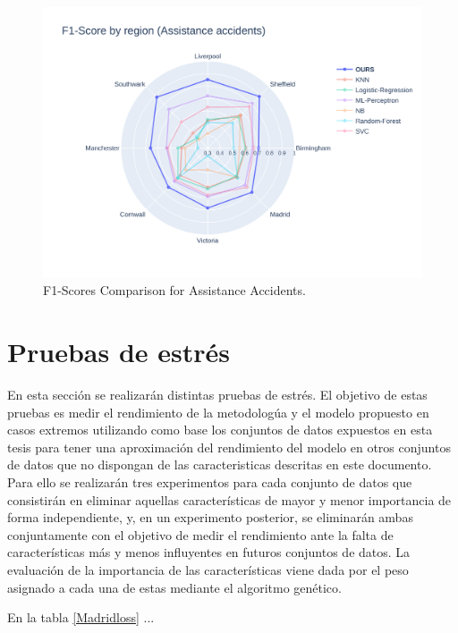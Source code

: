 \documentclass{uathesis-es}
\begin{document}
\begin{figure}[H]
    \centering
    \includegraphics[width=150mm]{Figures/Assistance.png}
    \caption{F1-Scores Comparison for Assistance Accidents.}
    \label{GlobalAssistanceF1Score}
\end{figure}

\section{Pruebas de estrés}

En esta sección se realizarán distintas pruebas de estrés. El objetivo de estas pruebas es medir el rendimiento de la metodologúa y el modelo propuesto en casos extremos utilizando como base los conjuntos de datos expuestos en esta tesis para tener una aproximación del rendimiento del modelo en otros conjuntos de datos que no dispongan de las caracteristicas descritas en este documento. Para ello se realizarán tres experimentos para cada conjunto de datos que consistirán en eliminar aquellas características de mayor y menor importancia de forma independiente, y, en un experimento posterior, se eliminarán ambas conjuntamente con el objetivo de medir el rendimiento ante la falta de características más y menos influyentes en futuros conjuntos de datos. La evaluación de la importancia de las características viene dada por el peso asignado a cada una de estas mediante el algoritmo genético.

En la tabla \ref{Madridloss} ...
\end{document}

